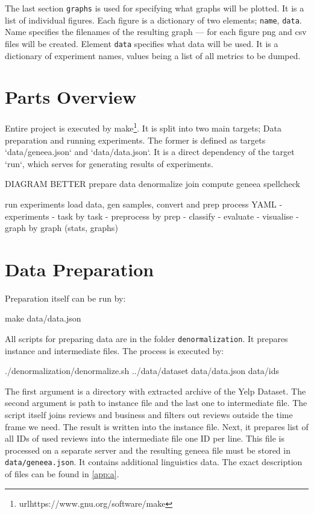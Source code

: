 The last section \texttt{graphs} is used for specifying what graphs will be plotted.
It is a list of individual figures.
Each figure is a dictionary of two elements; \texttt{name}, \texttt{data}.
Name specifies the filenames of the resulting graph ---
for each figure png and csv files will be created.
Element \texttt{data} specifies what data will be used.
It is a dictionary of experiment names, values being a list of all metrics to be dumped.

\section{Parts Overview}

Entire project is executed by make\footnote{url{https://www.gnu.org/software/make}}.
It is split into two main targets;
Data preparation and running experiments.
The former is defined as targets `data/geneea.json` and `data/data.json`.
It is a direct dependency of the target `run`, which serves for generating results
of experiments.

\begin{code}
DIAGRAM BETTER
prepare data
	denormalize
	join
	compute geneea
	spellcheck

run experiments
	load data, gen samples, convert and prep
	process YAML
		- experiments
			- task by task
				- preprocess by prep
				- classify
				- evaluate
		- visualise
			- graph by graph (stats, graphs)
\end{code}


\section{Data Preparation}

Preparation itself can be run by:

\begin{code}
make data/data.json
\end{code}

All scripts for preparing data are in the folder \texttt{denormalization}.
It prepares instance and intermediate files.
The process is executed by:

\begin{code}
./denormalization/denormalize.sh ../data/dataset data/data.json data/ids
\end{code}

The first argument is a directory with extracted archive of the Yelp Dataset.
The second argument is path to instance file and the last one to intermediate file.
The script itself joins reviews and business
and filters out reviews outside the time frame we need.
The result is written into the instance file.
Next, it prepares list of all IDs of used reviews into the intermediate file one ID per line.
This file is processed on a separate server and the resulting geneea file must be stored
in \texttt{data/geneea.json}.
It contains additional linguistics data.
The exact description of files can be found in \autoref{app:a}.


